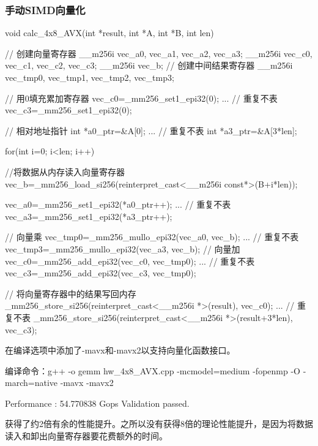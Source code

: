 \documentclass[UTF8,10pt]{ctexart}
\begin{document}
\subsubsection{手动SIMD向量化}
\begin{python}
    void calc_4x8_AVX(int *result, int *A, int *B, int len)
{
    // 创建向量寄存器
    __m256i vec_a0, vec_a1, vec_a2, vec_a3;
    __m256i vec_c0, vec_c1, vec_c2, vec_c3;
    __m256i vec_b;
    // 创建中间结果寄存器
    __m256i vec_tmp0, vec_tmp1, vec_tmp2, vec_tmp3;

    // 用0填充累加寄存器
    vec_c0=_mm256_set1_epi32(0);
    ... // 重复不表
    vec_c3=_mm256_set1_epi32(0);

    // 相对地址指针
    int *a0_ptr=&A[0];
    ... // 重复不表
    int *a3_ptr=&A[3*len];

    for(int i=0; i<len; i++)
    {
        //将数据从内存读入向量寄存器
        vec_b=_mm256_load_si256(reinterpret_cast<__m256i const*>(B+i*len));

        vec_a0=_mm256_set1_epi32(*a0_ptr++);
        ... // 重复不表
        vec_a3=_mm256_set1_epi32(*a3_ptr++);
        
        // 向量乘
        vec_tmp0=_mm256_mullo_epi32(vec_a0, vec_b);
        ... // 重复不表
        vec_tmp3=_mm256_mullo_epi32(vec_a3, vec_b);
        // 向量加
        vec_c0=_mm256_add_epi32(vec_c0, vec_tmp0);
        ... // 重复不表
        vec_c3=_mm256_add_epi32(vec_c3, vec_tmp0);
    }

    // 将向量寄存器中的结果写回内存
    _mm256_store_si256(reinterpret_cast<__m256i *>(result), vec_c0);
    ... // 重复不表
    _mm256_store_si256(reinterpret_cast<__m256i *>(result+3*len), vec_c3);
}
\end{python}
在编译选项中添加了-mavx和-mavx2以支持向量化函数接口。
\begin{python}
编译命令：g++ -o gemm hw_4x8_AVX.cpp -mcmodel=medium -fopenmp -O -march=native -mavx -mavx2
\end{python}
\begin{python}
Performance : 54.770838 Gops
Validation passed.
\end{python}
获得了约2倍有余的性能提升。之所以没有获得8倍的理论性能提升，是因为将数据读入和卸出向量寄存器要花费额外的时间。
\end{document}
